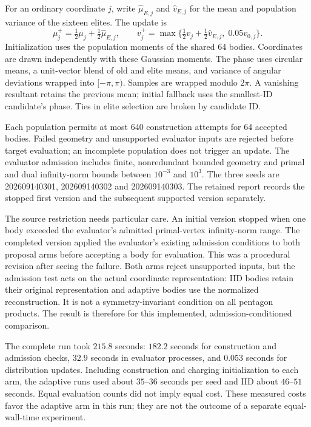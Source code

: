 For an ordinary coordinate $j$, write $\widehat\mu_{E,j}$ and
$\widehat v_{E,j}$ for the mean and population variance of the sixteen elites.
The update is
\[
 \mu_j^+=\tfrac12\mu_j+\tfrac12\widehat\mu_{E,j},\qquad
 v_j^+=\max\{\tfrac12v_j+\tfrac12\widehat v_{E,j},\;0.05v_{0,j}\}.
\]
Initialization uses the population moments of the shared 64 bodies.
Coordinates are drawn independently with these Gaussian moments. The phase
uses circular means, a unit-vector blend of old and elite means, and variance
of angular deviations wrapped into $[-\pi,\pi)$. Samples are wrapped modulo
$2\pi$. A vanishing resultant retains the previous mean; initial fallback
uses the smallest-ID candidate's phase. Ties in elite selection are broken
by candidate ID.

Each population permits at most 640 construction attempts for 64 accepted
bodies. Failed geometry and unsupported evaluator inputs are rejected before
target evaluation; an incomplete population does not trigger an update.
The evaluator admission includes finite, nonredundant bounded geometry and
primal and dual infinity-norm bounds between $10^{-3}$ and $10^3$.
The three seeds are 202609140301, 202609140302 and 202609140303. The retained
report records the stopped first version and the subsequent supported
version separately.

The source restriction needs particular care. An initial version stopped
when one body exceeded the evaluator's admitted primal-vertex infinity-norm range.
The completed version applied the evaluator's existing admission conditions
to both proposal arms before accepting a body for evaluation. This was a
procedural revision after seeing the failure. Both arms reject unsupported
inputs, but the admission test acts on the actual coordinate representation:
IID bodies retain their original representation and adaptive bodies use the
normalized reconstruction. It is not a symmetry-invariant condition on all
pentagon products. The result is therefore for this implemented,
admission-conditioned comparison.

The complete run took $215.8$ seconds: $182.2$ seconds for construction and
admission checks, $32.9$ seconds in evaluator processes, and $0.053$ seconds
for distribution updates. Including construction and charging initialization
to each arm, the adaptive runs used about $35$--$36$ seconds per seed and IID
about $46$--$51$ seconds. Equal evaluation counts did not imply equal cost.
These measured costs favor the adaptive arm in this run; they are not the
outcome of a separate equal-wall-time experiment.



